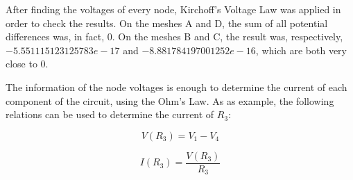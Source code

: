 After finding the voltages of every node, Kirchoff's Voltage Law was applied in order to check the results. 
On the meshes A and D, the sum of all potential differences was, in fact, 0. 
On the meshes B and C, the result was, respectively, $-5.551115123125783e-17$ and $-8.881784197001252e-16$, which are both very close to 0.

The information of the node voltages is enough to determine the current of each component of the circuit, using the Ohm's Law. As as example, the following relations can be used to determine the current of $R_3$:

\begin{equation}
  V(R_3) = V_1 - V_4
  \label{eq:VR3n}
\end{equation}

\begin{equation}
  I(R_3) = \frac{V(R_3)}{R_3}
  \label{eq:IR3n}
\end{equation}


